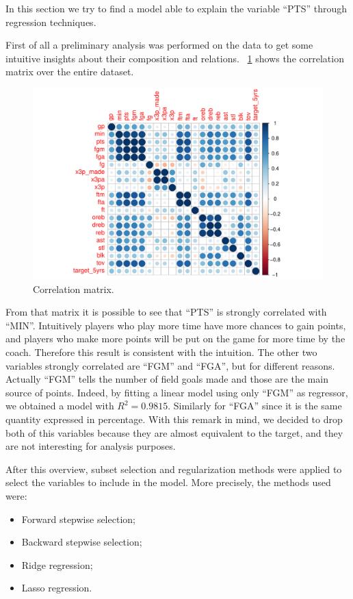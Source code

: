In this section we try to find a model able to explain the variable ``PTS'' through regression techniques.

First of all a preliminary analysis was performed on the data to get some intuitive insights about their composition and relations.
\Fig~\ref{fig:CorrMatrix} shows the correlation matrix over the entire dataset.
\begin{figure}[H]
	\centering
	\includegraphics[width=0.75\linewidth]{ImageFiles/Regression/CorrMatrix.pdf}
	\caption{Correlation matrix.}
	\label{fig:CorrMatrix}
\end{figure}

From that matrix it is possible to see that ``PTS'' is strongly correlated with ``MIN''. Intuitively players who play more time have more chances to gain points, and players who make more points will be put on the game for more time by the coach. Therefore this result is consistent with the intuition.
The other two variables strongly correlated are ``FGM'' and ``FGA'', but for different reasons. Actually ``FGM'' tells the number of field goals made and those are the main source of points. Indeed, by fitting a linear model using only ``FGM'' as regressor, we obtained a model with $R^2 = 0.9815$. Similarly for ``FGA'' since it is the same quantity expressed in percentage. With this remark in mind, we decided to drop both of this variables because they are almost equivalent to the target, and they are not interesting for analysis purposes.

After this overview, subset selection and regularization methods were applied to select the variables to include in the model. More precisely, the methods used were:
\begin{itemize}
	\item Forward stepwise selection;
	\item Backward stepwise selection;
	\item Ridge regression;
	\item Lasso regression.
\end{itemize}
